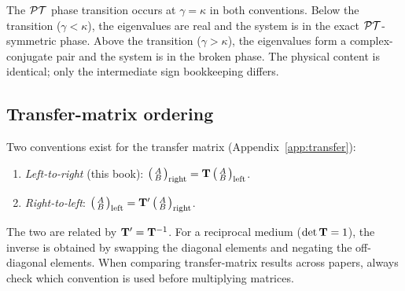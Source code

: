 The $\mathcal{PT}$ phase transition occurs at $\gamma = \kappa$ in both
conventions. Below the transition ($\gamma < \kappa$), the
eigenvalues are real and the system is in the exact $\mathcal{PT}$-symmetric
phase. Above the transition ($\gamma > \kappa$), the eigenvalues form
a complex-conjugate pair and the system is in the broken phase. The
physical content is identical; only the intermediate sign bookkeeping
differs.

\subsection{Transfer-matrix ordering}
\label{ssec:transfer-ordering}

Two conventions exist for the transfer matrix
(Appendix~\ref{app:transfer}):
\begin{enumerate}
 \item \emph{Left-to-right} (this book):
 $\bigl(\begin{smallmatrix} A \\ B \end{smallmatrix}\bigr)_{\text{right}}
 = \mathbf{T}\,
 \bigl(\begin{smallmatrix} A \\ B \end{smallmatrix}\bigr)_{\text{left}}$.
 \item \emph{Right-to-left}:
 $\bigl(\begin{smallmatrix} A \\ B \end{smallmatrix}\bigr)_{\text{left}}
 = \mathbf{T}'\,
 \bigl(\begin{smallmatrix} A \\ B \end{smallmatrix}\bigr)_{\text{right}}$.
\end{enumerate}
The two are related by $\mathbf{T}' = \mathbf{T}^{-1}$. For a reciprocal medium
($\det\mathbf{T} = 1$), the inverse is obtained by swapping the diagonal
elements and negating the off-diagonal elements. When comparing
transfer-matrix results across papers, always check which convention is
used before multiplying matrices.
